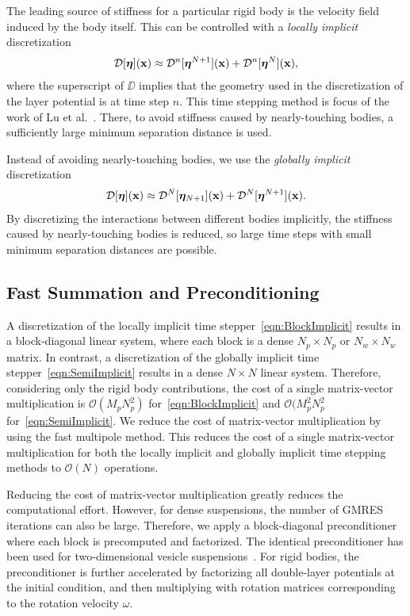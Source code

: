\documentclass[preprint, 10pt]{elsarticle}
\begin{document}
The leading source of stiffness for a particular rigid body is the
velocity field induced by the body itself. This can be controlled with a {\em locally implicit} discretization
\begin{align}
  {\mathcal{D}}[{\boldsymbol\eta}]({\mathbf{x}}) \approx {\mathcal{D}}^{n}[{\boldsymbol\eta}^{N+1}]({\mathbf{x}}) +
  {\mathcal{D}}^{n}[{\boldsymbol\eta}^N]({\mathbf{x}}),
  \label{eqn:BlockImplicit}
\end{align}
where the superscript of $\DD$ implies that the geometry used in the
discretization of the layer potential is at time step $n$.  This time
stepping method is focus of the work of Lu et al.~\cite{Lu2017}.
There, to avoid stiffness caused by nearly-touching bodies, a
sufficiently large minimum separation distance is used.
 
Instead of avoiding nearly-touching bodies, we use the {\em globally
implicit} discretization
\begin{align}
  {\mathcal{D}}[{\boldsymbol\eta}]({\mathbf{x}}) \approx {\mathcal{D}}^{N}[{\boldsymbol\eta}_{N+1}]({\mathbf{x}}) +
  {\mathcal{D}}^{N}[{\boldsymbol\eta}^{N+1}]({\mathbf{x}}).
  \label{eqn:SemiImplicit}
\end{align}
By discretizing the interactions between different bodies implicitly,
the stiffness caused by nearly-touching bodies is reduced, so large time
steps with small minimum separation distances are possible.


\subsection{Fast Summation and Preconditioning}
\label{sec:fast}
A discretization of the locally implicit time
stepper~\eqref{eqn:BlockImplicit} results in a block-diagonal linear
system, where each block is a dense $N_p \times N_p$ or $N_w \times N_w$
matrix.  In contrast, a discretization of the globally implicit time
stepper~\eqref{eqn:SemiImplicit} results in a dense $N \times N$ linear
system.  Therefore, considering only the rigid body contributions, the
cost of a single matrix-vector multiplication is $\mathcal{O}(M_p
N_p^2)$ for~\eqref{eqn:BlockImplicit} and $\mathcal{O}(M_p^2 N_p^2$
for~\eqref{eqn:SemiImplicit}.  We reduce the cost of matrix-vector
multiplication by using the fast multipole method.  This reduces the
cost of a single matrix-vector multiplication for both the locally
implicit and globally implicit time stepping methods to $\mathcal{O}(N)$
operations.

Reducing the cost of matrix-vector multiplication greatly reduces the
computational effort.  However, for dense suspensions, the number of
GMRES iterations can also be large.  Therefore, we apply a
block-diagonal preconditioner where each block is precomputed and
factorized.  The identical preconditioner has been used for
two-dimensional vesicle suspensions~\cite{Quaife2014}.  For rigid
bodies, the preconditioner is further accelerated by factorizing all
double-layer potentials at the initial condition, and then multiplying
with rotation matrices corresponding to the rotation velocity $\omega$.
\end{document}
